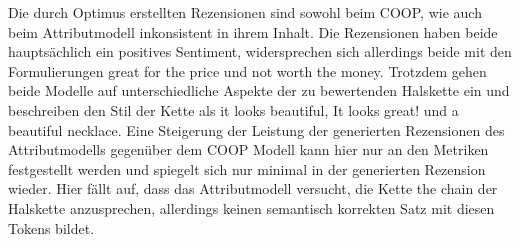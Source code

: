 Die durch Optimus erstellten Rezensionen sind sowohl beim COOP, wie auch beim Attributmodell inkonsistent in ihrem Inhalt. 
Die Rezensionen haben beide hauptsächlich ein positives Sentiment, widersprechen sich allerdings beide mit den Formulierungen \glqq{}great for the price\grqq{} und \glqq{}not worth the money\grqq{}.
Trotzdem gehen beide Modelle auf unterschiedliche Aspekte der zu bewertenden Halskette ein und beschreiben den Stil der Kette als \glqq{}it looks beautiful\grqq{}, \glqq{}It looks great!\grqq{} und \glqq{}a beautiful necklace\grqq{}.
Eine Steigerung der Leistung der generierten Rezensionen des Attributmodells gegenüber dem COOP Modell kann hier nur an den Metriken festgestellt werden und spiegelt sich nur minimal in der generierten Rezension wieder.
Hier fällt auf, dass das Attributmodell versucht, die Kette \glqq{}the chain\grqq{} der Halskette anzusprechen, allerdings keinen semantisch korrekten Satz mit diesen Tokens bildet.

